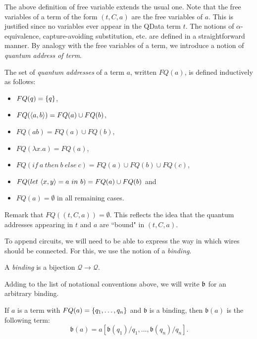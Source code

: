 \documentclass{article}
\begin{document}
The above definition of free variable extends the usual one. Note that the 
free variables of a term of the form $(t,C,a)$ are the free variables of $a$. This
is justified since no variables ever appear in the QData term $t$. The notions 
of $\alpha$-equivalence, capture-avoiding substitution, etc. are defined in 
a straightforward manner. By analogy with the free variables of a term, we 
introduce a notion of \emph{quantum address of term}.

\begin{definition}
The set of \emph{quantum addresses} of a term $a$, written $FQ(a)$, is defined 
inductively as follows:
\begin{itemize}
  \item $FQ(q)=\{q\}$,
  \item $FQ(\langle a,b\rangle)=FQ(a)\cup FQ(b)$,
  \item $FQ(ab)=FQ(a)\cup FQ(b)$,
  \item $FQ(\lambda x.a)=FQ(a)$,
  \item $FQ(if ~a~ then ~b~ else ~c) = FQ(a) \cup FQ(b) \cup FQ(c)$,
  \item $FQ(let ~\langle x,y\rangle=a ~in~ b)= FQ(a)\cup FQ(b)$ and
  \item $FQ(a)=\emptyset$ in all remaining cases.
\end{itemize}
\end{definition}

Remark that $FQ((t,C,a))=\emptyset$. This reflects the idea that the quantum 
addresses appearing in $t$ and $a$ are ``bound" in $(t,C,a)$. 

To append circuits, we will need to be able to express the way in which wires should 
be connected. For this, we use the notion of a \emph{binding}.

\begin{definition}
A \emph{binding} is a bijection $\mathcal{Q}\to \mathcal{Q}$.
\end{definition}


Adding to the list of notational conventions above, we will write $\mathfrak{b}$ for an 
arbitrary binding. 

\begin{definition}
If $a$ is a term with $FQ(a)=\{q_1,\ldots,q_n\}$ and $\mathfrak{b}$ is a binding, 
then $\mathfrak{b}(a)$ is the following term:
\[
\mathfrak{b}(a)= a[\mathfrak{b}(q_1)/q_1,\ldots ,\mathfrak{b}(q_n)/q_n].
\]
\end{definition}
\end{document}
